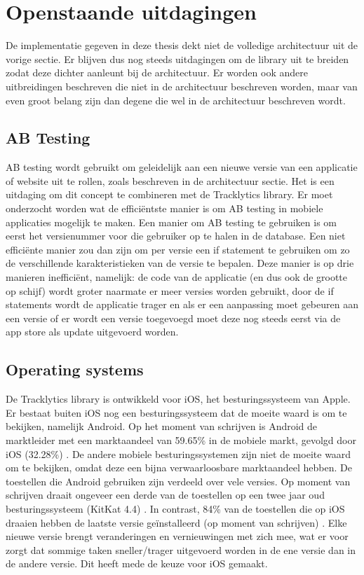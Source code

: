 \section{Openstaande uitdagingen}
De implementatie gegeven in deze thesis dekt niet de volledige architectuur uit de vorige sectie. Er blijven dus nog steeds uitdagingen om de library uit te breiden zodat deze dichter aanleunt bij de architectuur. Er worden ook andere uitbreidingen beschreven die niet in de architectuur beschreven worden, maar van even groot belang zijn dan degene die wel in de architectuur beschreven wordt. 

\subsection{AB Testing}
AB testing wordt gebruikt om geleidelijk aan een nieuwe versie van een applicatie of website uit te rollen, zoals beschreven in de architectuur sectie. Het is een uitdaging om dit concept te combineren met de Tracklytics library. Er moet onderzocht worden wat de effici\"entste manier is om AB testing in mobiele applicaties mogelijk te maken.  Een manier om AB testing te gebruiken is om eerst het versienummer voor die gebruiker op te halen in de database. Een niet effici\"ente manier zou dan zijn om per versie een if statement te gebruiken om zo de verschillende karakteristieken van de versie te bepalen. Deze manier is op drie manieren ineffici\"ent, namelijk: de code van de applicatie (en dus ook de grootte op schijf) wordt groter naarmate er meer versies worden gebruikt, door de if statements wordt de applicatie trager en als er een aanpassing moet gebeuren aan een versie of er wordt een versie toegevoegd moet deze nog steeds eerst via de app store als update uitgevoerd worden.


\subsection{Operating systems} 
De Tracklytics library is ontwikkeld voor iOS, het besturingssysteem van Apple. Er bestaat buiten iOS nog een besturingssysteem dat de moeite waard is om te bekijken, namelijk Android. Op het moment van schrijven is Android de marktleider met een marktaandeel van 59.65\% in de mobiele markt, gevolgd door iOS (32.28\%) \cite{MarketShare}. De andere mobiele besturingssystemen zijn niet de moeite waard om te bekijken, omdat deze een bijna verwaarloosbare marktaandeel hebben. De toestellen die Android gebruiken zijn verdeeld over vele versies. Op moment van schrijven draait ongeveer een derde van de toestellen op een twee jaar oud besturingssysteem (KitKat 4.4) \cite{AndroidMS}. In contrast, 84\% van de toestellen die op iOS draaien hebben de laatste versie ge\"installeerd (op moment van schrijven) \cite{iOSMS}. Elke nieuwe versie brengt veranderingen en vernieuwingen met zich mee, wat er voor zorgt dat sommige taken sneller/trager uitgevoerd worden in de ene versie dan in de andere versie. Dit heeft mede de keuze voor iOS gemaakt. \\

